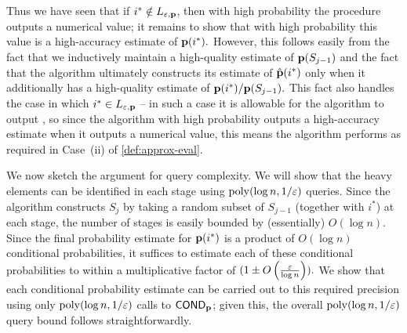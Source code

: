 Thus we have seen that if $i^\ast \notin L_{\varepsilon,\mathbf{p}}$, then with high probability the procedure outputs a numerical value;
it remains to show that with high probability this value is a high-accuracy
estimate of $\mathbf{p}(i^\ast).$
However, this follows easily from the
fact that we inductively maintain a high-quality estimate of
$\mathbf{p}(S_{j-1})$ and the fact that the algorithm ultimately constructs
its estimate of $\hat{\mathbf{p}}(i^\ast)$ only when it additionally
has a high-quality estimate of
$\mathbf{p}(i^\ast)/\mathbf{p}(S_{j-1}).$
This fact also handles the case in which
$i^\ast \in L_{\varepsilon,\mathbf{p}}$ -- in such a case it is allowable
for the algorithm to output \unknown, so since the algorithm with
high probability outputs a high-accuracy estimate when it outputs a numerical value,
this means the algorithm performs as required in Case~(ii) of
\cref{def:approx-eval}.

We now sketch the argument for query complexity.
We will show that the heavy elements can be identified in each stage
using $\operatorname*{poly}(\log n,1/\varepsilon)$ queries.
Since the algorithm constructs $S_j$ by taking a random subset of
$S_{j-1}$ (together with $i^\ast$) at each stage, the number of stages
is easily bounded by (essentially) $O(\log n).$  Since the
final probability estimate for $\mathbf{p}(i^\ast)$ is a product of
$O(\log n)$ conditional probabilities, it suffices to estimate
each of these conditional probabilities to within a multiplicative
factor of $(1 \pm O\left({\frac {\varepsilon}{\log n}}\right)).$
We show that each conditional
probability estimate can be carried out to this required precision
using only $\operatorname*{poly}(\log n,1/\varepsilon)$ calls to ${\sf COND}_{\mathbf{p}}$;
given this, the overall $\operatorname*{poly}(\log n,1/\varepsilon)$ query bound
follows straightforwardly.


